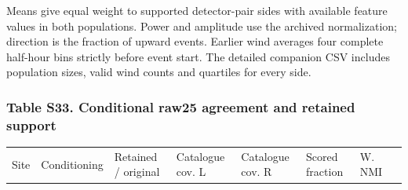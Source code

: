 \documentclass[a4paper,11pt]{article}
\newcounter{none}
\begin{document}
Means give equal weight to supported detector-pair sides with available feature values in both populations. Power and amplitude use the archived normalization; direction is the fraction of upward events. Earlier wind averages four complete half-hour bins strictly before event start. The detailed companion CSV includes population sizes, valid wind counts and quartiles for every side.

\subsubsection{Table S33. Conditional raw25 agreement and retained support}\label{table-s33.-conditional-raw25-agreement-and-retained-support}

{\def\LTcaptype{none} %
\begin{longtable}[]{@{}
  >{\raggedright\arraybackslash}p{}
  >{\raggedright\arraybackslash}p{}
  >{\raggedright\arraybackslash}p{}
  >{\raggedright\arraybackslash}p{}
  >{\raggedright\arraybackslash}p{}
  >{\raggedright\arraybackslash}p{}
  >{\raggedright\arraybackslash}p{}
  >{\raggedright\arraybackslash}p{}@{}}
\toprule\noalign{}
\begin{minipage}[b]{\linewidth}\raggedright
Site
\end{minipage} & \begin{minipage}[b]{\linewidth}\raggedright
Conditioning
\end{minipage} & \begin{minipage}[b]{\linewidth}\raggedright
Retained / original
\end{minipage} & \begin{minipage}[b]{\linewidth}\raggedright
Catalogue cov. L
\end{minipage} & \begin{minipage}[b]{\linewidth}\raggedright
Catalogue cov. R
\end{minipage} & \begin{minipage}[b]{\linewidth}\raggedright
Scored fraction
\end{minipage} & \begin{minipage}[b]{\linewidth}\raggedright
W. NMI
\end{minipage} & \begin{minipage}[b]{\linewidth}\raggedright

\end{minipage}
\end{longtable}}
\end{document}
